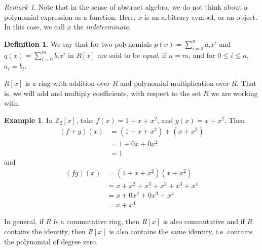 \documentclass[11pt]{article}
\theoremstyle{definition}\newtheorem{definition}{Definition}
\theoremstyle{definition}\newtheorem*{notation}{Notation}
\theoremstyle{definition}\newtheorem{example}{Example}
\theoremstyle{theorem}\newtheorem{theorem}{Theorem}
\theoremstyle{theorem}\newtheorem{corollary}{Corollary}
\theoremstyle{theorem}\newtheorem{proposition}{Proposition}
\theoremstyle{theorem}\newtheorem{lemma}{Lemma}
\theoremstyle{theorem}\newtheorem{question}{Question}
\theoremstyle{remark}\newtheorem{remark}{Remark}
\newcommand{\Z}{\mathbb{Z}}
\begin{document}
\begin{remark}\label{remark:1}
    Note that in the sense of abstract algebra, we do not think about a polynomial expression as a function. Here, $x$ is an arbitrary symbol, or an object. In this case, we call $x$ the \emph{indeterminate}.
\end{remark}

\begin{definition}\label{definition:2}
    We say that for two polynomials $p(x) = \sum_{i = 0}^{n} a_ix^i$ and $q(x) = \sum_{i = 0}^{m} b_ix^i$ in $R[x]$ are said to be \emph{equal}, if $n = m$, and for $0 \leq i \leq n$, $a_i = b_i$.
\end{definition}

$R[x]$ is a ring with addition over $R$ and polynomial multiplication over $R$. That is, we will add and multiply coefficients, with respect to the set $R$ we are working with.

\begin{example}\label{example:1}
    In $\Z_2[x]$, take $f(x) = 1 + x + x^2$, and $g(x) = x + x^2$. Then
    \begin{align*}
        (f + g)(x) &= (1 + x + x^2) + (x + x^2) \\
        &= 1 + 0x + 0x^2 \\
        &= 1
    \end{align*}
    and
    \begin{align*}
        (fg)(x) &= (1 + x + x^2)(x + x^2) \\
        &= x + x^2 + x^3 + x^2 + x^3 + x^4 \\
        &= x + 0x^2 + 0x^3 + x^4 \\
        &= x + x^4
    \end{align*}
\end{example}

In general, if $R$ is a commutative ring, then $R[x]$ is also commutative and if $R$ contains the identity, then $R[x]$ is also contains the same identity, i.e. contains the polynomial of degree zero.
\end{document}
